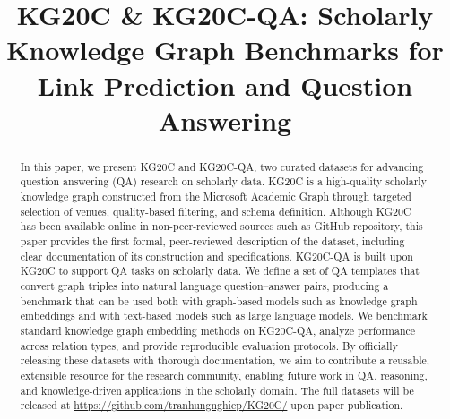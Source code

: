 \documentclass[conference]{IEEEtran}
\begin{document}
\title{KG20C \& KG20C-QA: Scholarly Knowledge Graph Benchmarks for Link Prediction and Question Answering}

\author{
\and
{}
}

\maketitle

\begin{abstract}
In this paper, we present KG20C and KG20C-QA, two curated datasets for advancing question answering (QA) research on scholarly data. KG20C is a high-quality scholarly knowledge graph constructed from the Microsoft Academic Graph through targeted selection of venues, quality-based filtering, and schema definition. Although KG20C has been available online in non-peer-reviewed sources such as GitHub repository, this paper provides the first formal, peer-reviewed description of the dataset, including clear documentation of its construction and specifications. KG20C-QA is built upon KG20C to support QA tasks on scholarly data. We define a set of QA templates that convert graph triples into natural language question--answer pairs, producing a benchmark that can be used both with graph-based models such as knowledge graph embeddings and with text-based models such as large language models. We benchmark standard knowledge graph embedding methods on KG20C-QA, analyze performance across relation types, and provide reproducible evaluation protocols. By officially releasing these datasets with thorough documentation, we aim to contribute a reusable, extensible resource for the research community, enabling future work in QA, reasoning, and knowledge-driven applications in the scholarly domain. The full datasets will be released at \url{https://github.com/tranhungnghiep/KG20C/} upon paper publication.
\end{abstract}
\end{document}
